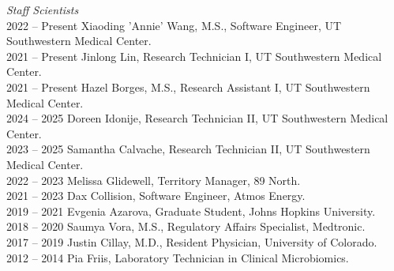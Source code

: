 \textit{Staff Scientists} \\
2022 -- Present \hspace{14pt} Xiaoding 'Annie' Wang, M.S., Software Engineer, UT Southwestern Medical Center. \\
2021 -- Present \hspace{14pt} Jinlong Lin, Research Technician I, UT Southwestern Medical Center. \\
2021 -- Present \hspace{14pt} Hazel Borges, M.S., Research Assistant I, UT Southwestern Medical Center. \\
2024 -- 2025 \hspace{28pt} Doreen Idonije, Research Technician II, UT Southwestern Medical Center. \\
2023 -- 2025 \hspace{28pt} Samantha Calvache, Research Technician II, UT Southwestern Medical Center. \\
2022 -- 2023 \hspace{28pt} Melissa Glidewell, Territory Manager, 89 North. \\
2021 -- 2023 \hspace{28pt} Dax Collision, Software Engineer, Atmos Energy. \\
2019 -- 2021 \hspace{28pt} Evgenia Azarova, Graduate Student, Johns Hopkins University. \\
2018 -- 2020 \hspace{28pt} Saumya Vora, M.S., Regulatory Affairs Specialist, Medtronic. \\
2017 -- 2019 \hspace{28pt} Justin Cillay, M.D., Resident Physician, University of Colorado. \\
2012 -- 2014 \hspace{28pt} Pia Friis,  Laboratory Technician in Clinical Microbiomics. \\


